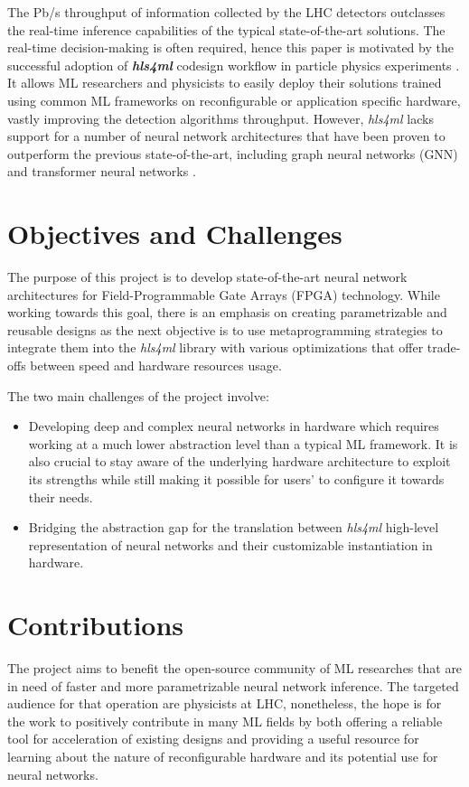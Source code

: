 The Pb/s throughput of information collected by the LHC detectors outclasses the real-time inference capabilities of the typical state-of-the-art solutions. The real-time decision-making is often required, hence this paper is motivated by the successful adoption of  \textit{\textbf{hls4ml}} codesign workflow in particle physics experiments \cite{8-fahim2021hls4ml:}. It allows ML researchers and physicists to easily deploy their solutions trained using common ML frameworks on reconfigurable or application specific hardware, vastly improving the detection algorithms throughput. However, \textit{hls4ml} lacks support for a number of neural network architectures that have been proven to outperform the previous state-of-the-art, including graph neural networks (GNN) \cite{9-newman2019jedi-net:, 11-elabd2021graph} and transformer neural networks \cite{3-yuan2021constituentnet:}.


\section{Objectives and Challenges}
The purpose of this project is to develop state-of-the-art neural network architectures for Field-Programmable Gate Arrays (FPGA) technology. While working towards this goal, there is an emphasis on creating parametrizable and reusable designs as the next objective is to use metaprogramming strategies to integrate them into the \textit{hls4ml} library with various optimizations that offer trade-offs between speed and hardware resources usage.

The two main challenges of the project involve:
\begin{itemize}
  \item Developing deep and complex neural networks in hardware which requires working at a much lower abstraction level than a typical ML framework. It is also crucial to stay aware of the underlying hardware architecture to exploit its strengths while still making it possible for users' to configure it towards their needs.
  \item Bridging the abstraction gap for the translation between \textit{hls4ml} high-level representation of neural networks and their customizable instantiation in hardware.
\end{itemize}


\section{Contributions}
The project aims to benefit the open-source community of ML researches that are in need of faster and more parametrizable neural network inference. The targeted audience for that operation are physicists at LHC, nonetheless, the hope is for the work to positively contribute in many ML fields by both offering a reliable tool for acceleration of existing designs and providing a useful resource for learning about the nature of reconfigurable hardware and its potential use for neural networks.

